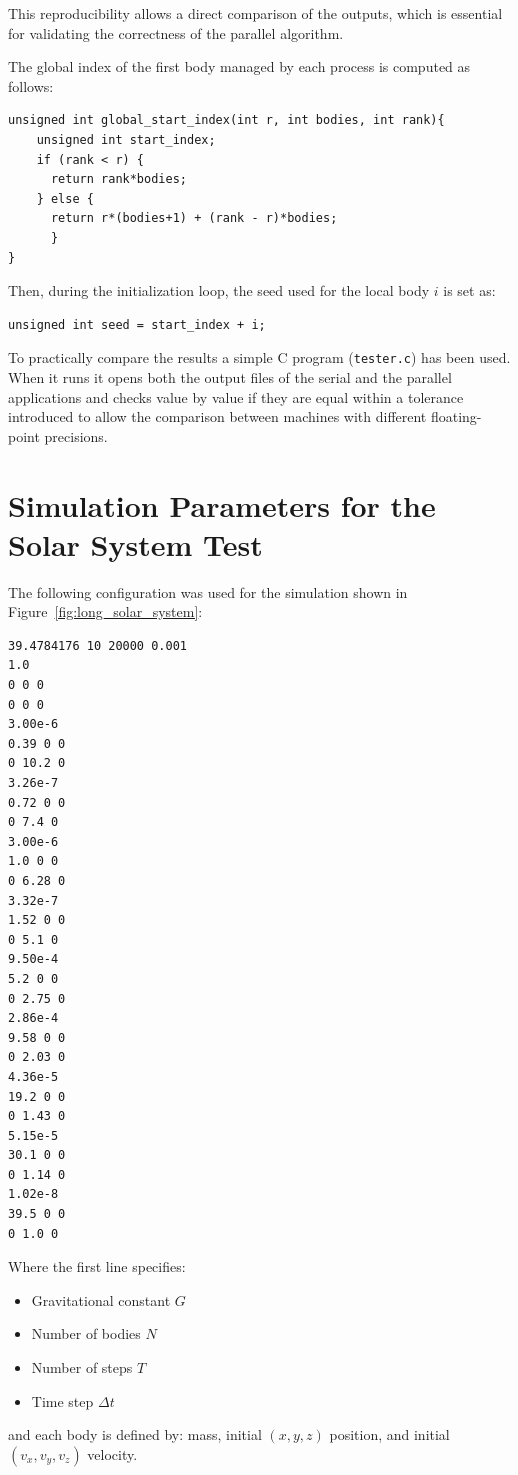 \documentclass{article}
\begin{document}
This reproducibility allows a direct comparison of the outputs, which is essential for validating the correctness of the parallel algorithm.

The global index of the first body managed by each process is computed as follows:
\begin{lstlisting}
unsigned int global_start_index(int r, int bodies, int rank){
    unsigned int start_index;
    if (rank < r) {
      return rank*bodies;
    } else {
      return r*(bodies+1) + (rank - r)*bodies;
      }
}
\end{lstlisting}
Then, during the initialization loop, the seed used for the local body $i$ is set as:
\begin{lstlisting}
unsigned int seed = start_index + i;
\end{lstlisting}

To practically compare the results a simple C program (\texttt{tester.c}) has been used.
When it runs it opens both the output files of the serial and the parallel applications and checks value by value if they are equal within a tolerance introduced to allow the comparison between machines with different floating-point precisions.


\appendix


\section[Simulation Parameters (Solar System)]{Simulation Parameters for the Solar System Test}
\label{appendix:solar_params}

The following configuration was used for the simulation shown in Figure~\ref{fig:long_solar_system}:

\begin{verbatim}
39.4784176 10 20000 0.001
1.0
0 0 0
0 0 0
3.00e-6
0.39 0 0
0 10.2 0
3.26e-7
0.72 0 0
0 7.4 0
3.00e-6
1.0 0 0
0 6.28 0
3.32e-7
1.52 0 0
0 5.1 0
9.50e-4
5.2 0 0
0 2.75 0
2.86e-4
9.58 0 0
0 2.03 0
4.36e-5
19.2 0 0
0 1.43 0
5.15e-5
30.1 0 0
0 1.14 0
1.02e-8
39.5 0 0
0 1.0 0
\end{verbatim}

Where the first line specifies:
\begin{itemize}
    \item Gravitational constant $G$
    \item Number of bodies $N$
    \item Number of steps $T$
    \item Time step $\Delta t$
\end{itemize}
and each body is defined by: mass, initial $(x, y, z)$ position, and initial $(v_x, v_y, v_z)$ velocity.
\end{document}
